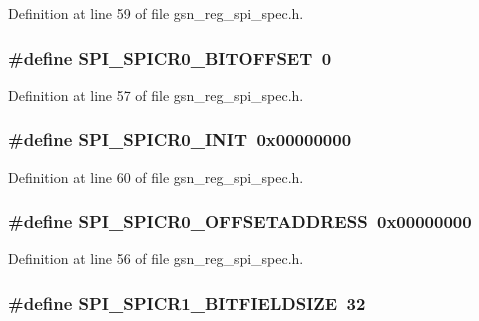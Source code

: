 Definition at line 59 of file gsn\_\-reg\_\-spi\_\-spec.h.

\hypertarget{a00573_a9cacf32f81824e9d822bb3390aa19a0f}{
\subsubsection[{SPI\_\-SPICR0\_\-BITOFFSET}]{\setlength{\rightskip}{0pt plus 5cm}\#define SPI\_\-SPICR0\_\-BITOFFSET~0}}
\label{a00573_a9cacf32f81824e9d822bb3390aa19a0f}


Definition at line 57 of file gsn\_\-reg\_\-spi\_\-spec.h.

\hypertarget{a00573_a9bc418fd6f049519c12a9ca025a7e1e4}{
\subsubsection[{SPI\_\-SPICR0\_\-INIT}]{\setlength{\rightskip}{0pt plus 5cm}\#define SPI\_\-SPICR0\_\-INIT~0x00000000}}
\label{a00573_a9bc418fd6f049519c12a9ca025a7e1e4}


Definition at line 60 of file gsn\_\-reg\_\-spi\_\-spec.h.

\hypertarget{a00573_ae87c9ffa29bfbf61db94992470165ed3}{
\subsubsection[{SPI\_\-SPICR0\_\-OFFSETADDRESS}]{\setlength{\rightskip}{0pt plus 5cm}\#define SPI\_\-SPICR0\_\-OFFSETADDRESS~0x00000000}}
\label{a00573_ae87c9ffa29bfbf61db94992470165ed3}


Definition at line 56 of file gsn\_\-reg\_\-spi\_\-spec.h.

\hypertarget{a00573_ab9bda7bb0b78bd515dbdc5f49e015210}{
\subsubsection[{SPI\_\-SPICR1\_\-BITFIELDSIZE}]{\setlength{\rightskip}{0pt plus 5cm}\#define SPI\_\-SPICR1\_\-BITFIELDSIZE~32}}
\label{a00573_ab9bda7bb0b78bd515dbdc5f49e015210}


